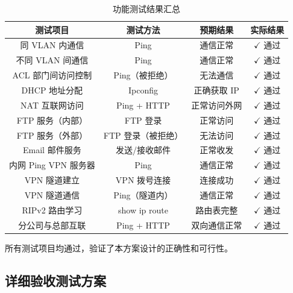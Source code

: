\documentclass[12pt,a4paper]{ctexart}
\begin{document}
\begin{table}[H]
\centering
\caption{功能测试结果汇总}
\label{tab:test-summary}
\begin{tabular}{|c|c|c|c|}
\hline
\textbf{测试项目}           & \textbf{测试方法}    & \textbf{预期结果}   & \textbf{实际结果}   \\ \hline
同 VLAN 内通信              & Ping                 & 通信正常            & $\checkmark$ 通过    \\ \hline
不同 VLAN 间通信            & Ping                 & 通信正常            & $\checkmark$ 通过    \\ \hline
ACL 部门间访问控制          & Ping（被拒绝）       & 无法通信            & $\checkmark$ 通过    \\ \hline
DHCP 地址分配               & Ipconfig             & 正确获取 IP         & $\checkmark$ 通过    \\ \hline
NAT 互联网访问              & Ping + HTTP          & 正常访问外网        & $\checkmark$ 通过    \\ \hline
FTP 服务（内部）            & FTP 登录             & 正常访问            & $\checkmark$ 通过    \\ \hline
FTP 服务（外部）            & FTP 登录（被拒绝）   & 无法访问            & $\checkmark$ 通过    \\ \hline
Email 邮件服务              & 发送/接收邮件        & 正常收发            & $\checkmark$ 通过    \\ \hline
内网 Ping VPN 服务器        & Ping                 & 通信正常            & $\checkmark$ 通过    \\ \hline
VPN 隧道建立                & VPN 拨号连接         & 连接成功            & $\checkmark$ 通过    \\ \hline
VPN 隧道通信                & Ping（隧道内）       & 通信正常            & $\checkmark$ 通过    \\ \hline
RIPv2 路由学习              & show ip route        & 路由表完整          & $\checkmark$ 通过    \\ \hline
分公司与总部互联            & Ping + HTTP          & 双向通信正常        & $\checkmark$ 通过    \\ \hline
\end{tabular}
\end{table}

所有测试项目均通过，验证了本方案设计的正确性和可行性。

\subsection{详细验收测试方案}
\end{document}
